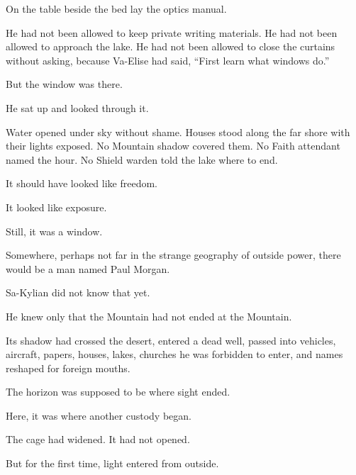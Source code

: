 On the table beside the bed lay the optics manual.\par
He had not been allowed to keep private writing materials. He had not been allowed to approach the lake. He had not been allowed to close the curtains without asking, because Va-Elise had said, “First learn what windows do.”\par
But the window was there.\par
He sat up and looked through it.\par
Water opened under sky without shame. Houses stood along the far shore with their lights exposed. No Mountain shadow covered them. No Faith attendant named the hour. No Shield warden told the lake where to end.\par
It should have looked like freedom.\par
It looked like exposure.\par
Still, it was a window.\par
Somewhere, perhaps not far in the strange geography of outside power, there would be a man named Paul Morgan.\par
Sa-Kylian did not know that yet.\par
He knew only that the Mountain had not ended at the Mountain.\par
Its shadow had crossed the desert, entered a dead well, passed into vehicles, aircraft, papers, houses, lakes, churches he was forbidden to enter, and names reshaped for foreign mouths.\par
The horizon was supposed to be where sight ended.\par
Here, it was where another custody began.\par
The cage had widened. It had not opened.\par
But for the first time, light entered from outside.\par

\ornament